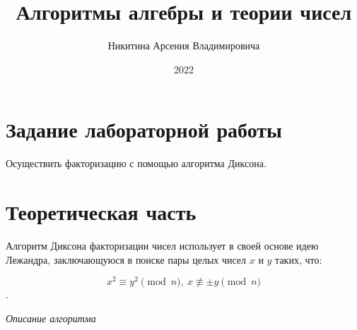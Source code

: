 \documentclass[bachelor, och, labwork]{shiza}
\begin{document}
\title{Алгоритмы алгебры и теории чисел}





\author{Никитина Арсения Владимировича}




\date{2022}

\maketitle



\tableofcontents

\section{Задание лабораторной работы}

Осуществить факторизацию с помощью алгоритма Диксона.

\section{Теоретическая часть}

Алгоритм Диксона факторизации чисел использует в своей основе идею Лежандра,
заключающуюся в поиске пары целых чисел $x$ и $y$ таких, что:

$$x^2 \equiv y^2 \pmod n, ~ x \not\equiv \pm y \pmod n$$.

\begin{center}
    \textit{Описание алгоритма}
\end{center}
\end{document}
